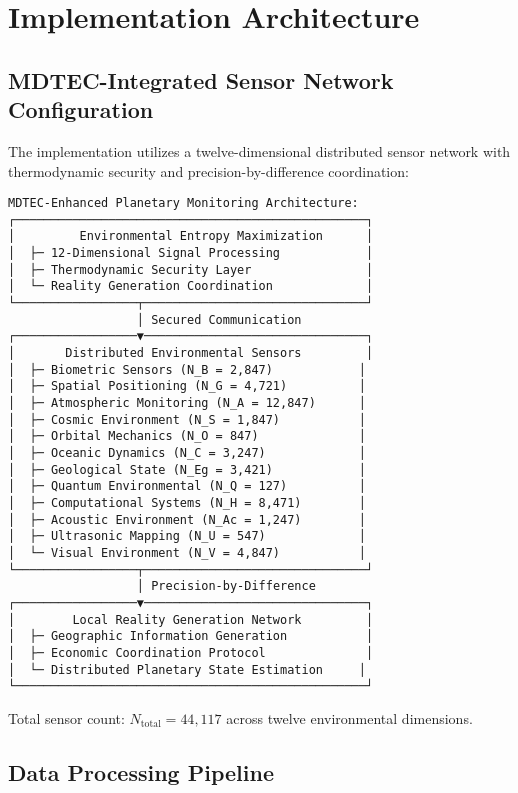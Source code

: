 \documentclass[12pt,a4paper]{article}
\begin{document}
\section{Implementation Architecture}

\subsection{MDTEC-Integrated Sensor Network Configuration}

The implementation utilizes a twelve-dimensional distributed sensor network with thermodynamic security and precision-by-difference coordination:

\begin{verbatim}
MDTEC-Enhanced Planetary Monitoring Architecture:
┌─────────────────────────────────────────────────┐
│         Environmental Entropy Maximization      │
│  ├─ 12-Dimensional Signal Processing            │
│  ├─ Thermodynamic Security Layer                │
│  └─ Reality Generation Coordination             │
└─────────────────┬───────────────────────────────┘
                  │ Secured Communication
┌─────────────────▼───────────────────────────────┐
│       Distributed Environmental Sensors         │
│  ├─ Biometric Sensors (N_B = 2,847)            │
│  ├─ Spatial Positioning (N_G = 4,721)          │
│  ├─ Atmospheric Monitoring (N_A = 12,847)      │
│  ├─ Cosmic Environment (N_S = 1,847)           │
│  ├─ Orbital Mechanics (N_O = 847)              │
│  ├─ Oceanic Dynamics (N_C = 3,247)             │
│  ├─ Geological State (N_Eg = 3,421)            │
│  ├─ Quantum Environmental (N_Q = 127)          │
│  ├─ Computational Systems (N_H = 8,471)        │
│  ├─ Acoustic Environment (N_Ac = 1,247)        │
│  ├─ Ultrasonic Mapping (N_U = 547)             │
│  └─ Visual Environment (N_V = 4,847)           │
└─────────────────┬───────────────────────────────┘
                  │ Precision-by-Difference
┌─────────────────▼───────────────────────────────┐
│        Local Reality Generation Network         │
│  ├─ Geographic Information Generation           │
│  ├─ Economic Coordination Protocol              │
│  └─ Distributed Planetary State Estimation     │
└─────────────────────────────────────────────────┘
\end{verbatim}

Total sensor count: $N_{\text{total}} = 44,117$ across twelve environmental dimensions.

\subsection{Data Processing Pipeline}
\end{document}
